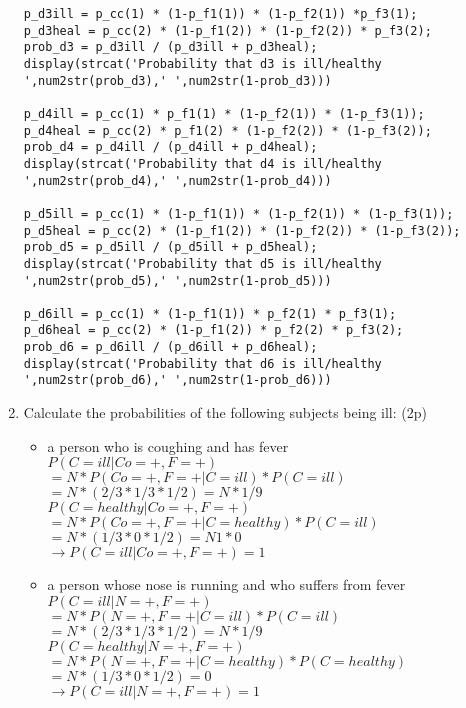 \documentclass{article}
\begin{document}
\begin{enumerate}
\begin{verbatim}
p_d3ill = p_cc(1) * (1-p_f1(1)) * (1-p_f2(1)) *p_f3(1); 
p_d3heal = p_cc(2) * (1-p_f1(2)) * (1-p_f2(2)) * p_f3(2);
prob_d3 = p_d3ill / (p_d3ill + p_d3heal);
display(strcat('Probability that d3 is ill/healthy ',num2str(prob_d3),' ',num2str(1-prob_d3)))

p_d4ill = p_cc(1) * p_f1(1) * (1-p_f2(1)) * (1-p_f3(1)); 
p_d4heal = p_cc(2) * p_f1(2) * (1-p_f2(2)) * (1-p_f3(2));
prob_d4 = p_d4ill / (p_d4ill + p_d4heal);
display(strcat('Probability that d4 is ill/healthy ',num2str(prob_d4),' ',num2str(1-prob_d4)))

p_d5ill = p_cc(1) * (1-p_f1(1)) * (1-p_f2(1)) * (1-p_f3(1)); 
p_d5heal = p_cc(2) * (1-p_f1(2)) * (1-p_f2(2)) * (1-p_f3(2));
prob_d5 = p_d5ill / (p_d5ill + p_d5heal);
display(strcat('Probability that d5 is ill/healthy ',num2str(prob_d5),' ',num2str(1-prob_d5)))

p_d6ill = p_cc(1) * (1-p_f1(1)) * p_f2(1) * p_f3(1); 
p_d6heal = p_cc(2) * (1-p_f1(2)) * p_f2(2) * p_f3(2);
prob_d6 = p_d6ill / (p_d6ill + p_d6heal);
display(strcat('Probability that d6 is ill/healthy ',num2str(prob_d6),' ',num2str(1-prob_d6)))
   \end{verbatim} \newpage
 \item Calculate the probabilities of the following subjects being ill: (2p) 
 	\begin{itemize}
	\item a person who is coughing and has fever \\
		$P(C = ill | Co = + , F = +) $ \\ $= N * P (Co = + , F = + | C = ill)*P(C = ill)$ \\ $= N*(2/3 * 1/3 * 1/2) = N*1/9$ \\
		$P(C = healthy | Co = + , F = +) $ \\ $= N * P (Co = + , F = + | C = healthy)*P(C = ill)$ \\ $= N*(1/3 * 0 * 1/2) = N1*0$ \\
		$\to P(C = ill | Co = + , F = +) = 1 $

	\item a person whose nose is running and who suffers from fever \\
		$P(C = ill | N = + , F = +) $ \\ $= N * P (N = + , F = + | C = ill)*P(C = ill)$ \\ $= N*(2/3 * 1/3 * 1/2) = N*1/9$ \\
		$P(C = healthy | N = + , F = +) $ \\ $= N * P (N = + , F = + | C = healthy)*P(C = healthy)$ \\ $= N*(1/3 * 0 * 1/2) = 0$\\
		$\to P(C = ill | N = + , F = +) = 1 $
	

\end{itemize}
\end{enumerate}
\end{document}

